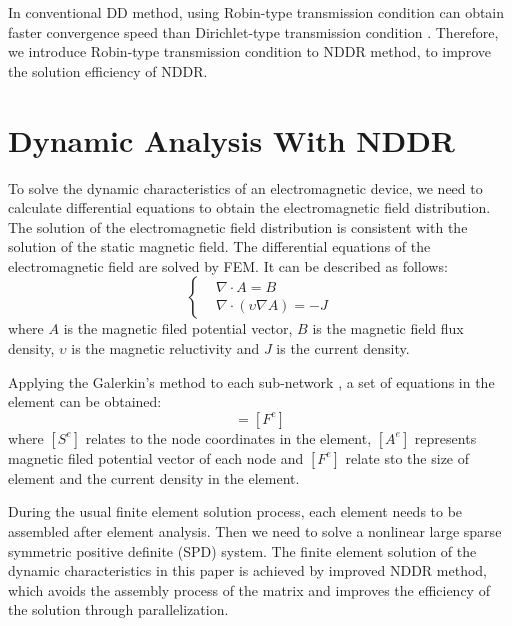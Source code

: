 \documentclass[journal,transmag]{IEEEtran}
\begin{document}
In conventional DD method, using Robin-type transmission condition  can obtain faster convergence speed than Dirichlet-type transmission condition \cite{IEEEhowto:Douglas}. Therefore, we introduce Robin-type transmission condition to NDDR method, to improve the solution efficiency of NDDR.
\section{Dynamic Analysis With NDDR}
To solve the dynamic characteristics of an electromagnetic device, we need to calculate differential equations to obtain the electromagnetic field distribution. The solution of the electromagnetic field distribution is consistent with the solution of the static magnetic field. The differential equations of the electromagnetic field are solved by FEM. It can be described as follows:
\begin{equation}
\left\{
\begin{aligned}
&{\nabla\cdot}A=B\\
&\nabla\cdot({\upsilon\nabla}A)=-J
\end{aligned}
\right.
\end{equation}
where $A$ is the magnetic filed potential vector, $B$ is the magnetic field flux density, $\upsilon$ is the magnetic reluctivity and $J$ is the current density. 

Applying the Galerkin's method to each sub-network \cite{IEEEhowto:Rao}, a set of equations in the element can be obtained:
\begin{equation}
[S^e][A^e]=[F^e]
\end{equation}
where $[S^e]$ relates to the node coordinates in the element, $[A^e]$ represents magnetic filed potential vector of each node and $[F^e]$ relate sto the size of element and the current density in the element.

During the usual finite element solution process, each element needs to be assembled after element analysis. Then we need to solve a nonlinear large sparse symmetric positive definite (SPD) system. The finite element solution of the dynamic characteristics in this paper is achieved by improved NDDR method, which avoids the assembly process of the matrix and improves the efficiency of the solution through parallelization.
\end{document}
